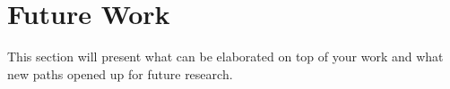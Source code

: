 


\section{Future Work}
This section will present what can be elaborated on top of your work and what new paths opened up for future research.